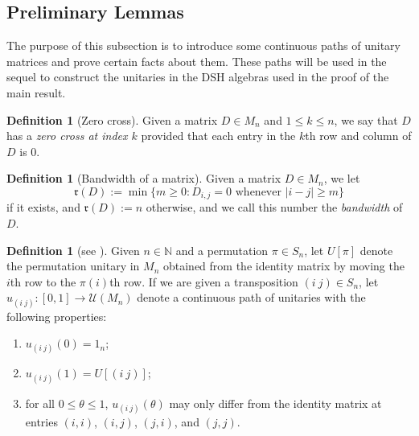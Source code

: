 \documentclass[12pt]{amsart}
\numberwithin{equation}{section}
\theoremstyle{definition}
\newtheorem{definition}[theorem]{Definition}
\theoremstyle{remark}
\newcommand{\NN}{\mathbb{N}}
\begin{document}
\subsection{Preliminary Lemmas}
\label{sc: prelim lemmas}

The purpose of this subsection is to introduce some continuous paths of unitary matrices and prove certain facts about them. These paths will be used in the sequel to construct the unitaries in the DSH algebras used in the proof of the main result.

\begin{definition}[Zero cross]
	\label{zero cross}
	Given a matrix $D\in M_{n}$ and $1\leq k\leq n$, we say that $D$ has a \textit{zero cross at index $k$} provided that each entry in the $k$th row and column of $D$ is $0$. 
\end{definition}


\begin{definition}[Bandwidth of a matrix]
	\label{bandwidth}
	Given a matrix $D\in M_{n}$, we let 
	$$
	\mathfrak{r}(D):=\min\{m\geq 0:D_{i,j}=0\text{ whenever }|i-j|\geq m\}
	$$ 
	if it exists, and $\mathfrak{r}(D):= n$ otherwise, and we call this number the \textit{bandwidth} of $D$. 
\end{definition}

\begin{definition}[see \cite{EHT}]
	\label{unitaries}
	Given $n\in\NN$ and a permutation $\pi\in S_{n}$, let $U[\pi]$ denote the permutation unitary in $M_{n}$ obtained from the identity matrix by moving the $i$th row to the $\pi(i)$th row. If we are given a transposition $(i \ j) \in S_{n}$, let $u_{(i \  j)}\colon[0,1]\to \mathcal{U}(M_{n})$ denote a continuous path of unitaries with the following properties:
	\begin{enumerate}
		\item $u_{(i \ j)}(0)=1_{n}$;
		\item $u_{(i \ j)}(1)=U[(i \ j)]$;
		\item for all $0\leq \theta\leq 1$, $u_{(i \ j)}(\theta)$ may only differ from the identity matrix at entries $(i,i)$, $(i,j)$, $(j, i)$, and $(j,j)$. 
	\end{enumerate}
\end{definition}
\end{document}
